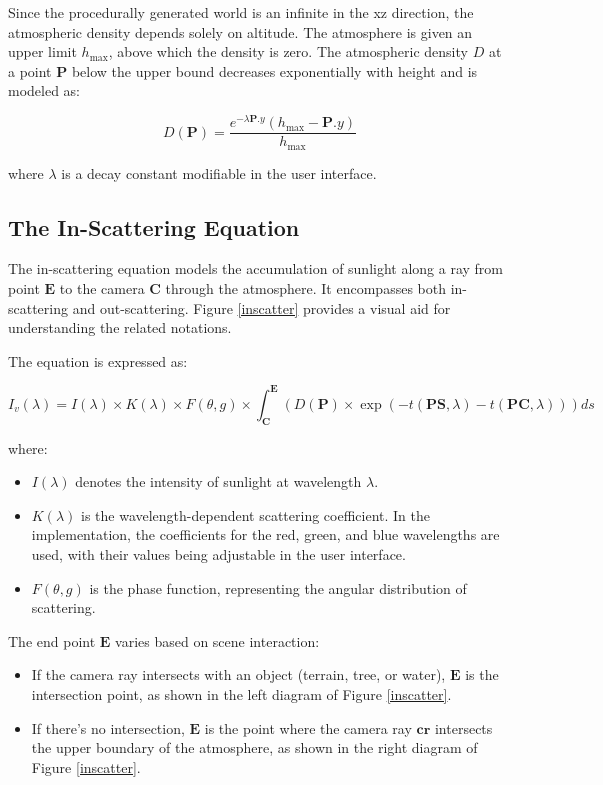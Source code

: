 Since the procedurally generated world is an infinite in the xz direction, the atmospheric density depends solely on altitude. The atmosphere is given an upper limit $h_{\text{max}}$, above which the density is zero. The atmospheric density $D$ at a point $\mathbf{P}$ below the upper bound decreases exponentially with height and is modeled as:

\begin{equation}
    D(\mathbf{P})=\frac{e^{-\lambda \mathbf{P}.y}\left(h_{\text{max}}-\mathbf{P}.y\right)}{h_{\text{max}}}
\end{equation}

where $\lambda$ is a decay constant modifiable in the user interface.

\subsection{The In-Scattering Equation}
\label{The In-Scattering Equation}

The in-scattering equation models the accumulation of sunlight along a ray from point $\mathbf{E}$ to the camera $\mathbf{C}$ through the atmosphere. It encompasses both in-scattering and out-scattering. Figure \ref{inscatter} provides a visual aid for understanding the related notations.

The equation is expressed as:

\begin{equation}
    I_v(\lambda) = I(\lambda) \times K(\lambda) \times F(\theta, g) \times \int_{\mathbf{C}}^{\mathbf{E}} \left( D(\mathbf{P}) \times \exp\left(-t\left({{\mathbf{PS}},\lambda}\right) -t \left({{\mathbf{PC}},\lambda}\right) \right)\right) ds
\end{equation}

where:
\begin{itemize}
    \item $I(\lambda)$ denotes the intensity of sunlight at wavelength $\lambda$.
    \item $K(\lambda)$ is the wavelength-dependent scattering coefficient. In the implementation, the coefficients for the red, green, and blue wavelengths are used, with their values being adjustable in the user interface.
    \item $F(\theta, g)$ is the phase function, representing the angular distribution of scattering.
\end{itemize}

The end point $\mathbf{E}$ varies based on scene interaction:
\begin{itemize}
    \item If the camera ray intersects with an object (terrain, tree, or water), $\mathbf{E}$ is the intersection point, as shown in the left diagram of Figure \ref{inscatter}.
    \item If there's no intersection, $\mathbf{E}$ is the point where the camera ray $\mathbf{cr}$ intersects the upper boundary of the atmosphere, as shown in the right diagram of Figure \ref{inscatter}.
\end{itemize}

